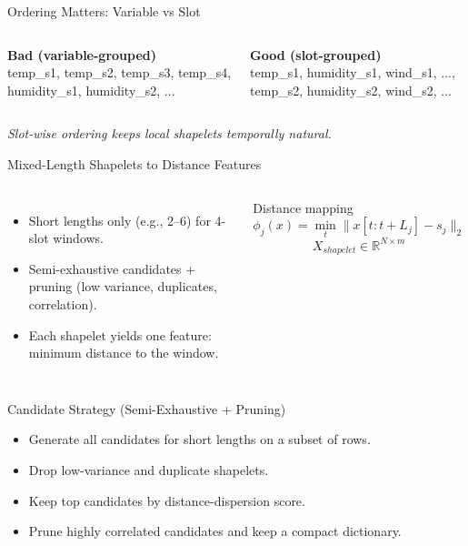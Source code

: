 \documentclass[aspectratio=169]{beamer}
\begin{document}
\begin{frame}{Ordering Matters: Variable vs Slot}
\begin{columns}[T,onlytextwidth]
  \begin{tcolorbox}[enhanced,boxrule=1pt,arc=2pt,colback=clight,colframe=cwarn]
    \footnotesize\textbf{Bad (variable-grouped)}\\[2pt]
    \scriptsize\ttfamily
    temp\_s1, temp\_s2, temp\_s3, temp\_s4,\\
    humidity\_s1, humidity\_s2, ...
  \end{tcolorbox}
  \begin{tcolorbox}[enhanced,boxrule=1pt,arc=2pt,colback=clight,colframe=cmid]
    \footnotesize\textbf{Good (slot-grouped)}\\[2pt]
    \scriptsize\ttfamily
    temp\_s1, humidity\_s1, wind\_s1, ...,\\
    temp\_s2, humidity\_s2, wind\_s2, ...
  \end{tcolorbox}
\end{columns}
\vspace{4pt}
{\scriptsize\itshape Slot-wise ordering keeps local shapelets temporally natural.}
\end{frame}

\begin{frame}{Mixed-Length Shapelets to Distance Features}
\begin{columns}[T,onlytextwidth]
  \begin{itemize}\footnotesize\setlength\itemsep{4pt}
    \item Short lengths only (e.g., 2--6) for 4-slot windows.
    \item Semi-exhaustive candidates + pruning (low variance, duplicates, correlation).
    \item Each shapelet yields one feature: minimum distance to the window.
  \end{itemize}
  \begin{block}{Distance mapping}
  \vspace{-6pt}
  \[
  \phi_j(x) = \min_{t} \lVert x[t:t+L_j] - s_j \rVert_2
  \]
  \[
  X_{shapelet} \in \mathbb{R}^{N \times m}
  \]
  \end{block}
\end{columns}
\end{frame}

\begin{frame}{Candidate Strategy (Semi-Exhaustive + Pruning)}
\begin{itemize}\footnotesize\setlength\itemsep{4pt}
  \item Generate all candidates for short lengths on a subset of rows.
  \item Drop low-variance and duplicate shapelets.
  \item Keep top candidates by distance-dispersion score.
  \item Prune highly correlated candidates and keep a compact dictionary.
\end{itemize}
\end{frame}
\end{document}
